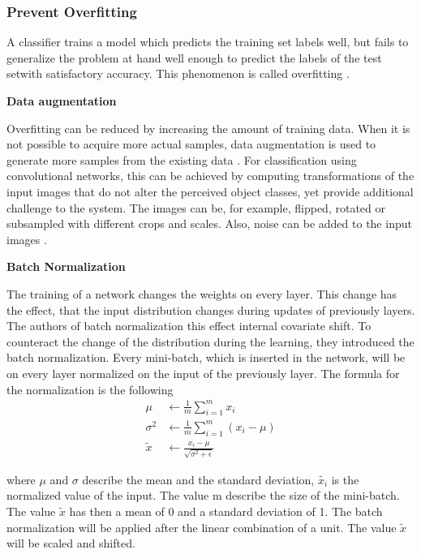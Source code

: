 \subsubsection*{Prevent Overfitting}
A classifier trains a model which predicts the training set labels well, but fails to generalize the problem
at hand well enough to predict the labels of the test setwith satisfactory accuracy. This
phenomenon is called overfitting \cite{bishop2006pattern}.

\textbf{Data augmentation}

Overfitting can be reduced by increasing the amount of training data. When it is not possible to acquire more actual samples, data augmentation is used to generate more samples from the existing data \cite{goodfellow2016deep}.  For classification using convolutional networks, this can be achieved by computing transformations of the input images that do not alter the perceived object classes, yet provide additional challenge to the system. The images can be, for example, flipped, rotated or subsampled with different crops and scales. Also, noise can be added to the input images \cite{goodfellow2016deep}.

\textbf{Batch Normalization}

The training of a network changes the weights on every layer. This change has the effect, that the input distribution changes during updates of previously layers. The authors of batch normalization \cite{ioffe2015batch} this effect internal covariate shift. To counteract the change of the distribution during the learning, they introduced the batch normalization. Every mini-batch, which is inserted in the network, will be on every layer normalized on the input of the previously layer. The formula for the normalization is the following
\begin{align}
	\mu &\leftarrow \frac{1}{m} \sum_{i=1}^{m}x_i \\
	\sigma ^{2}&\leftarrow \frac{1}{m} \sum_{i=1}^{m}\left ( x_i-\mu  \right ) \\
	\tilde{x}&\leftarrow \frac{x_i-\mu}{\sqrt{\sigma ^{2}+\epsilon }}
\end{align}

where $\mu$ and $\sigma$ describe the mean and the standard deviation, $ \tilde{x_{i}} $ is the normalized value of the input. The value m describe the size of the mini-batch. The value $ \tilde{x} $ has then a mean of 0 and a standard deviation of 1. The batch normalization will be applied after the linear combination of a unit. The value $ \tilde{x} $ will be scaled and shifted.

